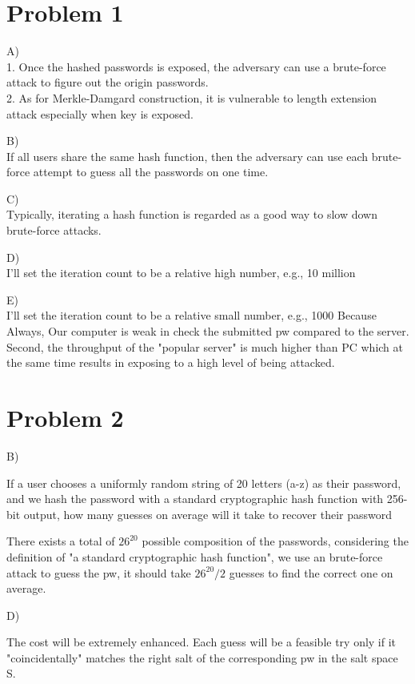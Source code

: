 \documentclass{6160}
\author{Ben Bitdiddle}
\begin{document}
\section*{Problem 1}

A)
\\1. Once the hashed passwords is exposed, the adversary can use a brute-force attack to figure out the origin passwords. \\
2. As for Merkle-Damgard construction, it is vulnerable to length extension attack especially when key is exposed.

B)
\\
If all users share the same hash function, then the adversary can use each brute-force attempt to guess all the passwords on one time.

C)
\\
Typically, iterating a hash function is regarded as a good way to slow down brute-force attacks.

D)
\\
I'll set the iteration count to be a relative high number, e.g., 10 million

E)
\\
I'll set the iteration count to be a relative small number, e.g., 1000
Because\\
Always, Our computer is weak in check the submitted pw compared to the server. Second, the throughput of the "popular server" is much higher than PC which at the same time results in exposing to a high level of being attacked.


\newpage
\section*{Problem 2}

B)

If a user chooses a uniformly random string of 20 letters (a-z) as their password, and we hash the password with a standard cryptographic hash function with 256-bit output, how many guesses on average will it take to recover their password

There exists a total of $26^{20}$ possible composition of the passwords, considering the definition of "a standard cryptographic hash function",
we use an brute-force attack to guess the pw, it should take $26^{20}/2$ guesses to find the correct one on average.

D)

The cost will be extremely enhanced.
Each guess will be a feasible try only
if it "coincidentally" matches the right salt
of the corresponding pw in the salt space S.
\end{document}
